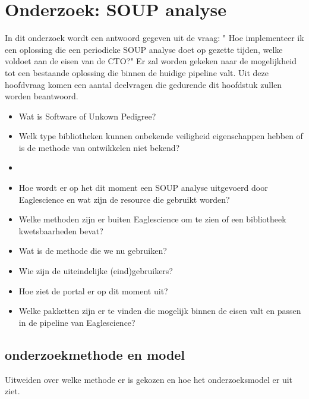 
\chapter{Onderzoek: SOUP analyse} %

\label{literatuurstudie} %

In dit onderzoek wordt een antwoord gegeven uit de vraag: " Hoe implementeer ik een oplossing die een periodieke SOUP analyse doet op gezette tijden, welke voldoet aan de eisen van de CTO?" Er zal worden gekeken naar de mogelijkheid tot een bestaande oplossing die binnen de huidige pipeline valt. Uit deze hoofdvraag komen een aantal deelvragen die gedurende dit hoofdstuk zullen worden beantwoord.

\begin{itemize}
\item Wat is Software of Unkown Pedigree?
\item Welk type bibliotheken kunnen onbekende veiligheid eigenschappen hebben of is de methode van ontwikkelen niet bekend?

\item
\item Hoe wordt er op het dit moment een SOUP analyse uitgevoerd door Eaglescience en wat zijn de resource die gebruikt worden?
\item Welke methoden zijn er buiten Eaglescience om te zien of een bibliotheek kwetsbaarheden bevat?
\item Wat is de methode die we nu gebruiken?
\item Wie zijn de uiteindelijke (eind)gebruikers?
\item Hoe ziet de portal er op dit moment uit?
\item Welke pakketten zijn er te vinden die mogelijk binnen de eisen valt en passen in de pipeline van Eaglescience?
\end{itemize}


 \section{onderzoekmethode en model}
 Uitweiden over welke methode er is gekozen en hoe het onderzoeksmodel er uit ziet.




